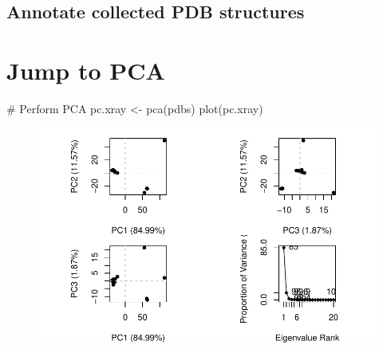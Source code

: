 \documentclass[
  letterpaper,
  DIV=11,
  numbers=noendperiod]{scrartcl}
\newenvironment{Shaded}{\begin{snugshade}}{\end{snugshade}}
\newcommand{\CommentTok}[1]{\textcolor[rgb]{0.37,0.37,0.37}{#1}}
\newcommand{\FunctionTok}[1]{\textcolor[rgb]{0.28,0.35,0.67}{#1}}
\newcommand{\NormalTok}[1]{\textcolor[rgb]{0.00,0.23,0.31}{#1}}
\newcommand{\OtherTok}[1]{\textcolor[rgb]{0.00,0.23,0.31}{#1}}
\begin{document}
\begin{Shaded}
\end{Shaded}

\hypertarget{annotate-collected-pdb-structures}{%
\subsection{Annotate collected PDB
structures}\label{annotate-collected-pdb-structures}}

\begin{Shaded}
\end{Shaded}

\hypertarget{jump-to-pca}{%
\section{Jump to PCA}\label{jump-to-pca}}

\begin{Shaded}
\begin{Highlighting}[]
\CommentTok{\# Perform PCA}
\NormalTok{pc.xray }\OtherTok{\textless{}{-}} \FunctionTok{pca}\NormalTok{(pdbs)}
\FunctionTok{plot}\NormalTok{(pc.xray)}
\end{Highlighting}
\end{Shaded}

\begin{figure}[H]

{\centering \includegraphics{Class09_files/figure-pdf/unnamed-chunk-13-1.pdf}

}

\end{figure}
\end{document}
